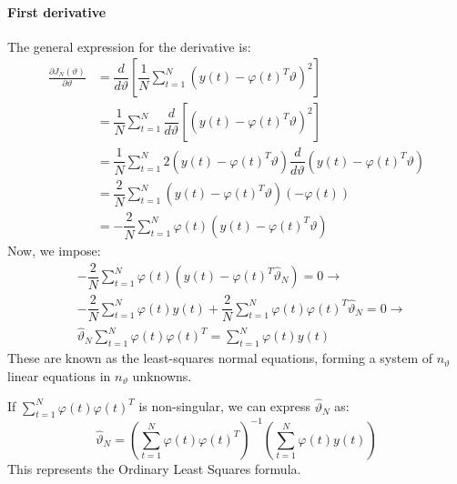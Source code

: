 \paragraph*{First derivative}
The general expression for the derivative is:
\begin{align*}
    \frac{\partial J_N(\vartheta)}{\partial\vartheta}   &=\dfrac{d}{d\vartheta}\left[\dfrac{1}{N}\sum_{t=1}^N\left( y(t)-\varphi(t)^T\vartheta \right)^2\right] \\
                                                        &=\dfrac{1}{N}\sum_{t=1}^N\dfrac{d}{d\vartheta}\left[\left( y(t)-\varphi(t)^T\vartheta \right)^2\right] \\
                                                        &=\dfrac{1}{N}\sum_{t=1}^N 2\left( y(t)-\varphi(t)^T\vartheta \right)\dfrac{d}{d\vartheta}\left( y(t)-\varphi(t)^T\vartheta \right) \\
                                                        &=\dfrac{2}{N}\sum_{t=1}^N \left( y(t)-\varphi(t)^T\vartheta \right)\left(-\varphi(t)\right) \\
                                                        &=-\dfrac{2}{N}\sum_{t=1}^N \varphi(t) \left( y(t)-\varphi(t)^T\vartheta \right)
\end{align*}
Now, we impose:
\begin{align*}
    &-\dfrac{2}{N}\sum_{t=1}^N \varphi(t) \left( y(t)-\varphi(t)^T\hat{\vartheta}_N \right) = 0 \rightarrow \\
    &-\dfrac{2}{N}\sum_{t=1}^N \varphi(t)y(t) + \dfrac{2}{N}\sum_{t=1}^N \varphi(t)\varphi(t)^T\hat{\vartheta}_N = 0 \rightarrow \\ 
    &\hat{\vartheta}_N \sum_{t=1}^N \varphi(t)\varphi(t)^T = \sum_{t=1}^N \varphi(t)y(t)
\end{align*}
These are known as the least-squares normal equations, forming a system of $n_\vartheta$ linear equations in $n_\vartheta$ unknowns.

If $\sum_{t=1}^N \varphi(t)\varphi(t)^T$ is non-singular, we can express $\hat{\vartheta}_N$ as:
\[\hat{\vartheta}_N=\left( \sum_{t=1}^N \varphi(t)\varphi(t)^T \right)^{-1}\left( \sum_{t=1}^N \varphi(t)y(t) \right)\]
This represents the Ordinary Least Squares formula.

